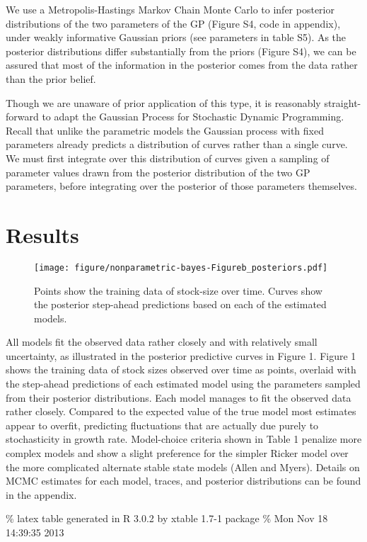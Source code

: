 \documentclass[author-year, review]{elsarticle} %
\makeatletter
\def\maxwidth{\ifdim\Gin@nat@width>\linewidth\linewidth
\else\Gin@nat@width\fi}
\let\Oldincludegraphics\includegraphics
\renewcommand{\includegraphics}[1]{\Oldincludegraphics[width=\maxwidth]{#1}}
\makeatother
\begin{document}
We use a Metropolis-Hastings Markov Chain Monte Carlo to infer posterior
distributions of the two parameters of the GP (Figure S4, code in
appendix), under weakly informative Gaussian priors (see parameters in
table S5). As the posterior distributions differ substantially from the
priors (Figure S4), we can be assured that most of the information in
the posterior comes from the data rather than the prior belief.

Though we are unaware of prior application of this type, it is
reasonably straight-forward to adapt the Gaussian Process for Stochastic
Dynamic Programming. Recall that unlike the parametric models the
Gaussian process with fixed parameters already predicts a distribution
of curves rather than a single curve. We must first integrate over this
distribution of curves given a sampling of parameter values drawn from
the posterior distribution of the two GP parameters, before integrating
over the posterior of those parameters themselves.

\section{Results}\label{results}

\begin{figure}[htbp]
\centering
\texttt{[image: figure/nonparametric-bayes-Figureb\_posteriors.pdf]}
\caption{Points show the training data of stock-size over time. Curves
show the posterior step-ahead predictions based on each of the estimated
models.}
\end{figure}

All models fit the observed data rather closely and with relatively
small uncertainty, as illustrated in the posterior predictive curves in
Figure 1. Figure 1 shows the training data of stock sizes observed over
time as points, overlaid with the step-ahead predictions of each
estimated model using the parameters sampled from their posterior
distributions. Each model manages to fit the observed data rather
closely. Compared to the expected value of the true model most estimates
appear to overfit, predicting fluctuations that are actually due purely
to stochasticity in growth rate. Model-choice criteria shown in Table 1
penalize more complex models and show a slight preference for the
simpler Ricker model over the more complicated alternate stable state
models (Allen and Myers). Details on MCMC estimates for each model,
traces, and posterior distributions can be found in the appendix.

\% latex table generated in R 3.0.2 by xtable 1.7-1 package \% Mon Nov
18 14:39:35 2013
\end{document}
